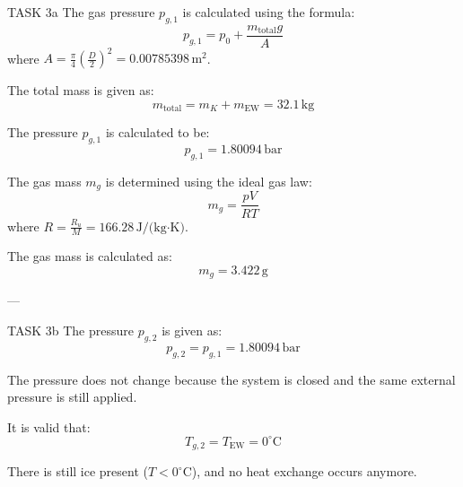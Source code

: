 TASK 3a  
The gas pressure \( p_{g,1} \) is calculated using the formula:  
\[
p_{g,1} = p_0 + \frac{m_{\text{total}} g}{A}
\]  
where \( A = \frac{\pi}{4} \left( \frac{D}{2} \right)^2 = 0.00785398 \, \text{m}^2 \).  

The total mass is given as:  
\[
m_{\text{total}} = m_K + m_{\text{EW}} = 32.1 \, \text{kg}
\]  

The pressure \( p_{g,1} \) is calculated to be:  
\[
p_{g,1} = 1.80094 \, \text{bar}
\]  

The gas mass \( m_g \) is determined using the ideal gas law:  
\[
m_g = \frac{p V}{R T}
\]  
where \( R = \frac{R_u}{M} = 166.28 \, \text{J/(kg·K)} \).  

The gas mass is calculated as:  
\[
m_g = 3.422 \, \text{g}
\]  

---

TASK 3b  
The pressure \( p_{g,2} \) is given as:  
\[
p_{g,2} = p_{g,1} = 1.80094 \, \text{bar}
\]  

The pressure does not change because the system is closed and the same external pressure is still applied.  

It is valid that:  
\[
T_{g,2} = T_{\text{EW}} = 0^\circ\text{C}
\]  

There is still ice present (\( T < 0^\circ\text{C} \)), and no heat exchange occurs anymore.